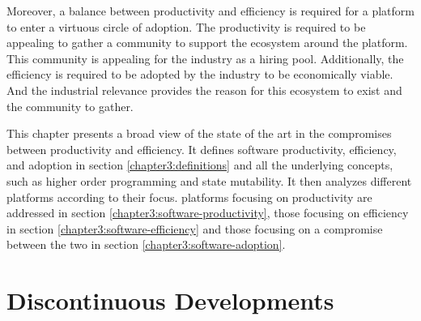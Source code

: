Moreover, a balance between productivity and efficiency is required for a platform to enter a virtuous circle of adoption.
The productivity is required to be appealing to gather a community to support the ecosystem around the platform.
This community is appealing for the industry as a hiring pool.
Additionally, the efficiency is required to be adopted by the industry to be economically viable.
And the industrial relevance provides the reason for this ecosystem to exist and the community to gather.

This chapter presents a broad view of the state of the art in the compromises between productivity and efficiency.
It defines software productivity, efficiency, and adoption in section \ref{chapter3:definitions} and all the underlying concepts, such as higher order programming and state mutability.
It then analyzes different platforms according to their focus. platforms focusing on productivity are addressed in section \ref{chapter3:software-productivity}, those focusing on efficiency in section \ref{chapter3:software-efficiency} and those focusing on a compromise between the two in section \ref{chapter3:software-adoption}.







\section{Discontinuous Developments}



